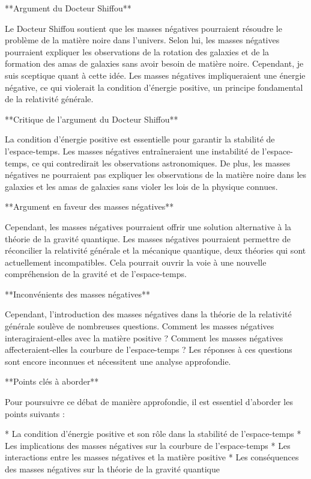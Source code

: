 **Argument du Docteur Shiffou**

Le Docteur Shiffou soutient que les masses négatives pourraient résoudre le problème de la matière noire dans l'univers. Selon lui, les masses négatives pourraient expliquer les observations de la rotation des galaxies et de la formation des amas de galaxies sans avoir besoin de matière noire. Cependant, je suis sceptique quant à cette idée. Les masses négatives impliqueraient une énergie négative, ce qui violerait la condition d'énergie positive, un principe fondamental de la relativité générale.

**Critique de l'argument du Docteur Shiffou**

La condition d'énergie positive est essentielle pour garantir la stabilité de l'espace-temps. Les masses négatives entraîneraient une instabilité de l'espace-temps, ce qui contredirait les observations astronomiques. De plus, les masses négatives ne pourraient pas expliquer les observations de la matière noire dans les galaxies et les amas de galaxies sans violer les lois de la physique connues.

**Argument en faveur des masses négatives**

Cependant, les masses négatives pourraient offrir une solution alternative à la théorie de la gravité quantique. Les masses négatives pourraient permettre de réconcilier la relativité générale et la mécanique quantique, deux théories qui sont actuellement incompatibles. Cela pourrait ouvrir la voie à une nouvelle compréhension de la gravité et de l'espace-temps.

**Inconvénients des masses négatives**

Cependant, l'introduction des masses négatives dans la théorie de la relativité générale soulève de nombreuses questions. Comment les masses négatives interagiraient-elles avec la matière positive ? Comment les masses négatives affecteraient-elles la courbure de l'espace-temps ? Les réponses à ces questions sont encore inconnues et nécessitent une analyse approfondie.

**Points clés à aborder**

Pour poursuivre ce débat de manière approfondie, il est essentiel d'aborder les points suivants :

* La condition d'énergie positive et son rôle dans la stabilité de l'espace-temps
* Les implications des masses négatives sur la courbure de l'espace-temps
* Les interactions entre les masses négatives et la matière positive
* Les conséquences des masses négatives sur la théorie de la gravité quantique

